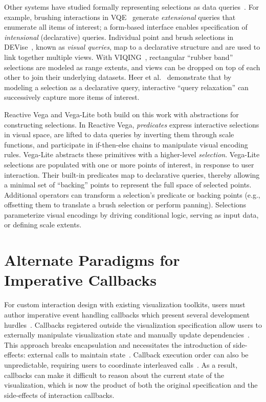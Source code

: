 Other systems have studied formally representing selections as data
queries~\cite{wilhelm:interaction}. For example, brushing interactions in
VQE~\cite{derthick:interactive} generate \emph{extensional} queries that
enumerate all items of interest; a form-based interface enables specification of
\emph{intensional} (declarative) queries. Individual point and brush selections
in DEVise~\cite{livny:devise}, known as \emph{visual queries}, map to a
declarative structure and are used to link together multiple views. With
VIQING~\cite{olsten:viqing}, rectangular ``rubber band'' selections are modeled
as range extents, and views can be dropped on top of each other to join their
underlying datasets. Heer et al.~\cite{heer:generalized} demonstrate that by
modeling a selection as a declarative query, interactive ``query relaxation''
can successively capture more items of interest.

Reactive Vega and Vega-Lite both build on this work with abstractions for
constructing selections. In Reactive Vega, \emph{predicates} express interactive
selections in visual space, are lifted to data queries by inverting them through
scale functions, and participate in if-then-else chains to manipulate visual
encoding rules. Vega-Lite abstracts these primitives with a higher-level
\emph{selection}. Vega-Lite selections are populated with one or more points of
interest, in response to user interaction. Their built-in predicates map to
declarative queries, thereby allowing a minimal set of ``backing'' points to
represent the full space of selected points. Additional operators can transform
a selection's predicate or backing points (e.g., offsetting them to translate a
brush selection or perform panning). Selections parameterize visual encodings by
driving conditional logic, serving as input data, or defining scale extents.

\section{Alternate Paradigms for Imperative Callbacks}

For custom interaction design with existing visualization toolkits, users must
author imperative event handling callbacks which present several development
hurdles~\cite{myers:callbacks}. Callbacks registered outside the visualization
specification allow users to externally manipulate visualization state and
manually update dependencies~\cite{cooper:embedding}. This approach breaks
encapsulation and necessitates the introduction of side-effects: external calls
to maintain state~\cite{cooper:integrating}. Callback execution order can also
be unpredictable, requiring users to coordinate interleaved
calls~\cite{edwards:coherent}. As a result, callbacks can make it difficult to
reason about the current state of the visualization, which is now the product of
both the original specification and the side-effects of interaction callbacks.

